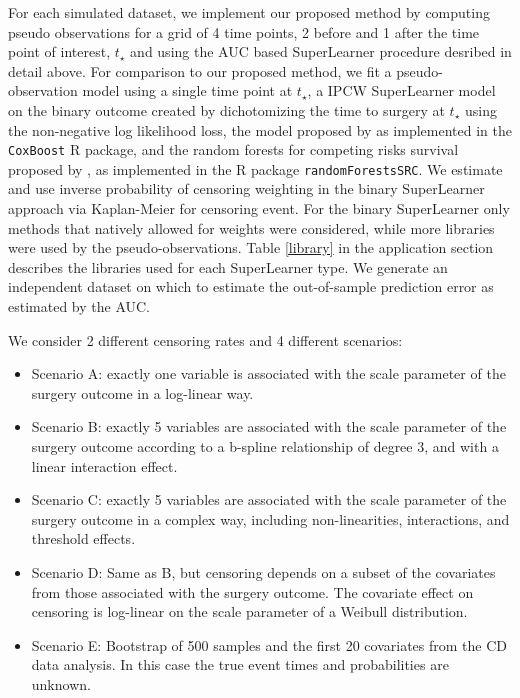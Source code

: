 \documentclass{statsoc}
\begin{document}
For each simulated dataset, we implement our proposed method by computing pseudo observations for a grid of 4 time points, 2 before and 1 after the time point of interest, $t_\star$ and using the AUC based SuperLearner procedure desribed in detail above. For comparison to our proposed method, we fit a pseudo-observation model using a single time point at $t_{\star}$, a IPCW SuperLearner model on the binary outcome created by dichotomizing the time to surgery at $t_{\star}$ using the non-negative log likelihood loss, the model proposed by \citet{binder2009boosting} as implemented in the \texttt{CoxBoost} R package, and the random forests for competing risks survival proposed by  \citep{ishwaran2014random}, as implemented in the R package \texttt{randomForestsSRC}. We estimate and use inverse probability of censoring weighting in the binary SuperLearner approach via Kaplan-Meier for censoring event. For the binary SuperLearner only methods that natively allowed for weights were considered, while more libraries were used by the pseudo-observations. Table \ref{library} in the application section describes the libraries used for each SuperLearner type. We generate an independent dataset on which to estimate the out-of-sample prediction error as estimated by the AUC. 

We consider 2 different censoring rates and 4 different scenarios:

\begin{itemize} 
\item Scenario A: exactly one variable is associated with the scale parameter of the surgery outcome in a log-linear way. 
\item Scenario B: exactly 5 variables are associated with the scale parameter of the surgery outcome according to a b-spline relationship of degree 3, and with a linear interaction effect.
\item Scenario C: exactly 5 variables are associated with the scale parameter of the surgery outcome in a complex way, including non-linearities, interactions, and threshold effects. 
\item Scenario D: Same as B, but censoring depends on a subset of the covariates from those associated with the surgery outcome. The covariate effect on censoring is log-linear on the scale parameter of a Weibull distribution. 
\item Scenario E: Bootstrap of 500 samples and the first 20 covariates from the CD data analysis. In this case the true event times and probabilities are unknown. 
\end{itemize}
\end{document}
